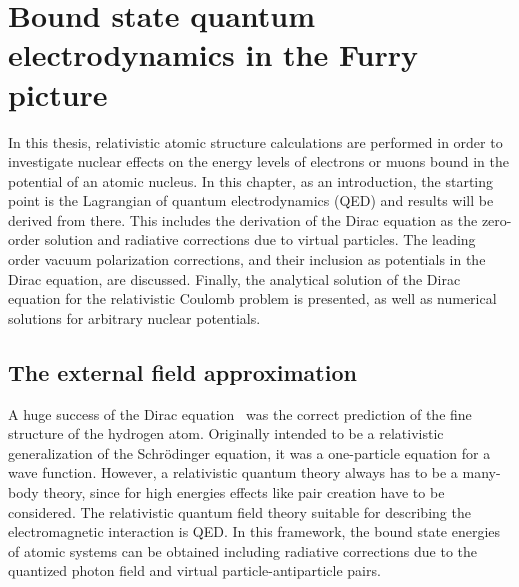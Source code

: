 \chapter{Bound state quantum electrodynamics in the Furry picture}
\label{ch:furry_pic}
In this thesis, relativistic atomic structure calculations are performed in order to investigate nuclear effects on the energy levels of electrons or muons bound in the potential of an atomic nucleus. In this chapter, as an introduction, the starting point is the Lagrangian of quantum electrodynamics (QED) and results will be derived from there. This includes the derivation of the Dirac equation as the zero-order solution and radiative corrections due to virtual particles. The leading order vacuum polarization corrections, and their inclusion as potentials in the Dirac equation, are discussed. Finally, the analytical solution of the Dirac equation for the relativistic Coulomb problem is presented, as well as numerical solutions for arbitrary nuclear potentials.
%
\section{The external field approximation}
\label{sec:ext_field}
A huge success of the Dirac equation~\cite{dirac1928} was the correct prediction of the fine structure of the hydrogen atom. Originally intended to be a relativistic generalization of the Schrödinger equation, it was a one-particle equation for a wave function. 
However, a relativistic quantum theory always has to be a many-body theory, since for high energies effects like pair creation have to be considered. The relativistic quantum field theory suitable for describing the electromagnetic interaction is QED. In this framework, the bound state energies of atomic systems can be obtained including radiative corrections due to the quantized photon field and virtual particle-antiparticle pairs. 

